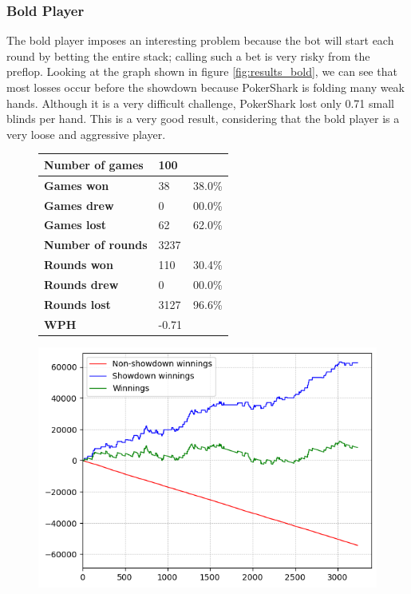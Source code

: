 \subsubsection{Bold Player}
The bold player imposes an interesting problem because the bot will start each round by betting the entire stack; calling such a bet is very risky from the preflop. Looking at the graph shown in figure \ref{fig:results_bold}, we can see that most losses occur before the showdown because PokerShark is folding many weak hands. Although it is a very difficult challenge, PokerShark lost only 0.71 small blinds per hand. This is a very good result, considering that the bold player is a very loose and aggressive player.

\begin{figure}[H]
    \centering
    \begin{minipage}{\textwidth}
        \begin{minipage}{0.40\textwidth}
            \begin{tabular}{|l|l|l|}
                \hline
                \textbf{Number of games}  & 100   &        \\ \hline
                \textbf{Games won}        & 38    & 38.0\% \\ \hline
                \textbf{Games drew}       & 0     & 00.0\%  \\ \hline
                \textbf{Games lost}       & 62    & 62.0\% \\ \hline
                \textbf{Number of rounds} & 3237  &        \\ \hline
                \textbf{Rounds won}       & 110   & 30.4\%  \\ \hline
                \textbf{Rounds drew}      & 0     & 00.0\%  \\ \hline
                \textbf{Rounds lost}      & 3127  & 96.6\% \\ \hline
                \textbf{WPH}              & -0.71 &        \\ \hline
            \end{tabular}
        \end{minipage}
        \hspace{0.05\textwidth}
        \begin{minipage}{0.5\textwidth}
            \includegraphics[width=\textwidth]{graphics/bold.png}

\end{minipage}
\end{minipage}
\end{figure}
